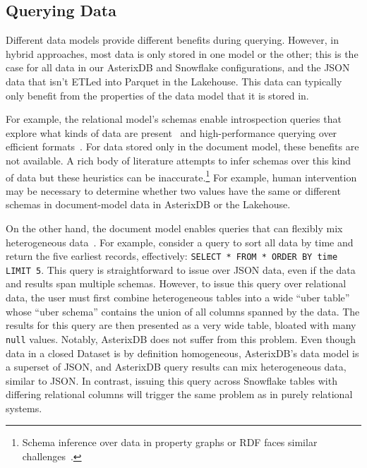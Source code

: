 \vspace{-0.8em}
\subsection{Querying Data} \label{ss:hybrid_querying}

Different data models provide different benefits during querying. However, in hybrid approaches, most data is only stored in one model or the other; this is the case for all data in our AsterixDB and Snowflake configurations, and the JSON data that isn't ETLed into Parquet in the Lakehouse. This data can typically only benefit from the properties of the data model that it is stored in.

For example, the relational model's schemas enable introspection queries that explore what kinds of data are present~\cite{aurum} and high-performance querying over efficient formats~\cite{snowflake, parquet, dremel, cstore}. For data stored only in the document model, these benefits are not available.
A rich body of literature attempts to infer schemas over this kind of data but these heuristics can be inaccurate.\footnote{Schema inference over data in property graphs or RDF faces similar challenges~\cite{deriving_rdf_schema, neo4j}.} For example, human intervention may be necessary to determine whether two values have the same or different schemas in document-model data in AsterixDB or the Lakehouse.

On the other hand, the document model enables queries that can flexibly mix heterogeneous data~\cite{lorel, asterixdb}. For example, consider a query to sort all data by time and return the five earliest records, effectively: \texttt{SELECT * FROM * ORDER BY time LIMIT 5}. This query is straightforward to issue over JSON data, even if the data and results span multiple schemas. However, to issue this query over relational data, the user must first combine heterogeneous tables into a wide ``uber table'' whose ``uber schema'' contains the union of all columns spanned by the data. The results for this query are then presented as a very wide table, bloated with many \texttt{null} values. Notably, AsterixDB does not suffer from this problem. Even though data in a closed Dataset is by definition homogeneous, AsterixDB's data model is a superset of JSON, and AsterixDB query results can mix heterogeneous data, similar to JSON. In contrast, issuing this query across Snowflake tables with differing relational columns will trigger the same problem as in purely relational systems.

